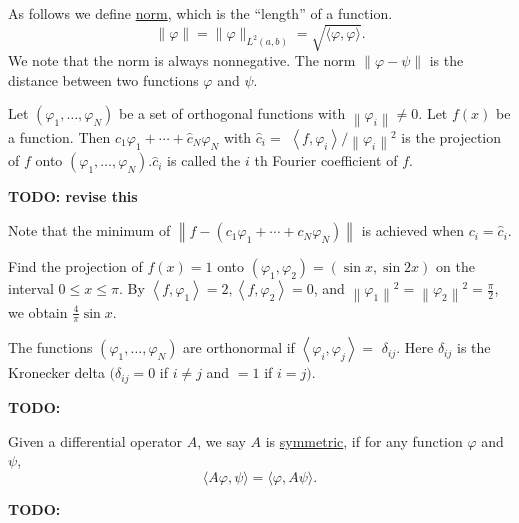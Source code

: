 \begin{definition}[Norm]
As follows we define \underline{norm}, which is the ``length'' of a function.
$$
\|\varphi\|=\|\varphi\|_{L^2(a, b)}=\sqrt{\langle\varphi, \varphi\rangle} .
$$
We note that the norm is always nonnegative. The norm $\|\varphi-\psi\|$ is the distance between two functions $\varphi$ and $\psi$.
\end{definition}

\begin{definition}[Projection]
    Let $\left(\varphi_1, \ldots, \varphi_N\right)$ be a set of orthogonal functions with $\left\|\varphi_i\right\| \neq 0$. Let $f(x)$ be a function. Then $\hat{c}_1 \varphi_1+\cdots+\hat{c}_N \varphi_N$ with $\hat{c}_i=$ $\left\langle f, \varphi_i\right\rangle /\left\|\varphi_i\right\|^2$ is the projection of $f$ onto $\left(\varphi_1, \ldots, \varphi_N\right) . \hat{c}_i$ is called the $i$ th Fourier coefficient of $f$. 

    \textbf{TODO: revise this}
\end{definition}


Note that the minimum of $\left\|f-\left(c_1 \varphi_1+\cdots+c_N \varphi_N\right)\right\|$ is achieved when $c_i=\hat{c}_i$.
    
\begin{example}[]
    Find the projection of $f(x)=1$ onto $\left(\varphi_1, \varphi_2\right)=(\sin x, \sin 2 x)$ on the interval $0 \leq x \leq \pi$. By $\left\langle f, \varphi_1\right\rangle=2,\left\langle f, \varphi_2\right\rangle=0$, and $\left\|\varphi_1\right\|^2=\left\|\varphi_2\right\|^2=\frac{\pi}{2}$, we obtain $\frac{4}{\pi} \sin x$.   
\end{example}

\begin{definition}[Orthonormal]
    The functions $\left(\varphi_1, \ldots, \varphi_N\right)$ are orthonormal if $\left\langle\varphi_i, \varphi_j\right\rangle=$ $\delta_{i j}$. Here $\delta_{i j}$ is the Kronecker delta $(\delta_{i j}=0$ if $i \neq j$ and $=1$ if $i=j)$.
\end{definition}

\begin{example}[]
    \textbf{TODO: }
\end{example}

\begin{definition} Given a differential operator $A$, we say $A$ is \underline{symmetric}, if for any function $\varphi$ and $\psi$,
\begin{equation}\label{eq.symm_operator}
    \langle A\varphi, \psi\rangle = \langle \varphi, A\psi\rangle.
\end{equation}

\begin{example}[]
    \textbf{TODO: }
\end{example}
    
\end{definition}

